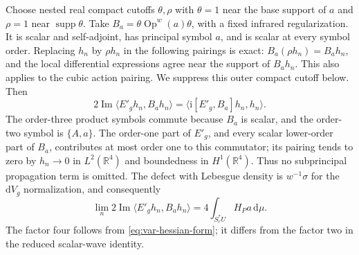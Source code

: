 \documentclass[11pt,a4paper]{article}
\numberwithin{equation}{section}
\newcommand{\supp}{\operatorname{supp}}
\newcommand{\dd}{\mathrm d}
\newcommand{\R}{\mathbb R}
\newcommand{\Op}{\operatorname{Op}}
\newcommand{\ip}[2]{\langle #1,#2\rangle}
\newcommand{\ii}{\mathrm{i}}
\renewcommand{\Im}{\operatorname{Im}}
\theoremstyle{definition}
\begin{document}
Choose nested real compact cutoffs $\theta,\rho$ with $\theta=1$
near the base support of $a$ and $\rho=1$ near $\supp\theta$.
Take $B_a=\theta\Op^w(a)\theta$, with a fixed infrared regularization.
It is scalar and self-adjoint, has principal symbol $a$, and is scalar
at every symbol order. Replacing $h_n$ by $\rho h_n$ in the following
pairings is exact: $B_a(\rho h_n)=B_ah_n$, and the local differential
expressions agree near the support of $B_ah_n$. This also applies to
the cubic action pairing. We suppress this outer compact cutoff below.
Then
\begin{equation*}
2\Im\ip{E'_gh_n}{B_ah_n}
=\ip{\ii [E'_g,B_a]h_n}{h_n}.
\end{equation*}
The order-three product symbols commute because $B_a$ is scalar, and
the order-two symbol is $\{A,a\}$. The order-one part of $E'_g$, and
every scalar lower-order part of $B_a$, contributes at most order one
to this commutator; its pairing tends to zero by $h_n\to0$ in $L^2(\R^4)$
and boundedness in $H^1(\R^4)$. Thus no subprincipal propagation term is omitted.
The defect with Lebesgue density is $w^{-1}\sigma$ for the
$\dd V_g$ normalization, and consequently
\begin{equation}\label{eq:var-commutator}
\lim_n2\Im\ip{E'_gh_n}{B_ah_n}=4\int_{S_r^*U} H_Pa\,\dd\mu.
\end{equation}
The factor four follows from \eqref{eq:var-hessian-form}; it differs
from the factor two in the reduced scalar-wave identity.
\end{document}
